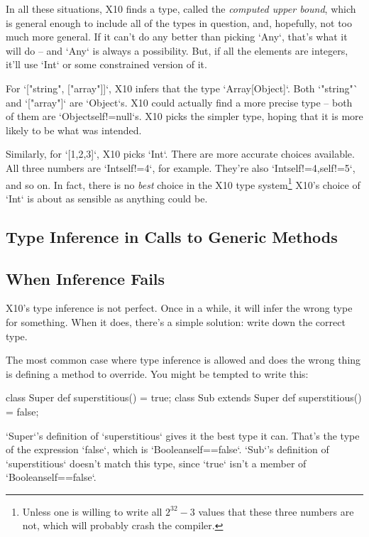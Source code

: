 In all these situations, X10 finds a type, called the {\em computed upper
bound}, which is general enough to include all of the types in question, and,
hopefully, not too much more general.  If it can't do any better than picking
\xcd`Any`, that's what it will do -- and \xcd`Any` is always a possibility.
But, if all the elements are integers, it'll use \xcd`Int` or some constrained
version of it.  

For \xcd`["string", ["array"]]`, X10 infers that the type \xcd`Array[Object]`.
Both \xcd`"string"` and \xcd`["array"]` are \xcd`Object`s.  X10 could actually
find a more precise type -- both of them are \xcd`Object{self!=null}`s. X10
picks the simpler type, hoping that it is more likely to be what was intended.

Similarly, for \xcd`[1,2,3]`, X10 picks \xcd`Int`.  There are more accurate
choices available.  All three numbers are \xcd`Int{self!=4}`, for example.
They're also \xcd`Int{self!=4,self!=5}`, and so on.  In fact, there is no {\em
best} choice in the X10 type system\footnote{Unless one is willing to write
all {$2^{32}-3$} values that these three numbers are not, which will probably
crash the compiler.}  X10's choice of \xcd`Int` is about as sensible as
anything could be. 





\subsection{Type Inference in Calls to Generic Methods}







\subsection{When Inference Fails}
X10's type inference is not perfect.  Once in a while, it will infer the wrong
type for something.  When it does, there's a simple solution: write down the
correct type.

The most common case where type inference is allowed and does the wrong thing
is defining a method to override.  You might be tempted to write this: 
\begin{xten}
class Super {
  def superstitious() = true;
}
class Sub extends Super {
  def superstitious() = false;
}
\end{xten}
\xcd`Super`'s definition of \xcd`superstitious` gives it the best type it can.
That's the type of the expression \xcd`false`, which is
\xcd`Boolean{self==false}`.  \xcd`Sub`'s definition of \xcd`superstitious`
doesn't match this type, since \xcd`true` isn't a member of 
\xcd`Boolean{self==false}`.

